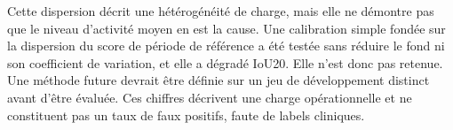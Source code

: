 \vspace{-\baselineskip}
Cette dispersion décrit une hétérogénéité de charge, mais elle ne démontre pas que le niveau
d'activité moyen en est la cause. Une calibration simple fondée sur la dispersion du score de
période de référence a été testée sans réduire le fond ni son coefficient de variation, et elle a dégradé
IoU20. Elle n'est donc pas retenue. Une méthode future devrait être définie sur un jeu de
développement distinct avant d'être évaluée. Ces chiffres décrivent une charge opérationnelle
et ne constituent pas un taux de faux positifs, faute de labels cliniques.
